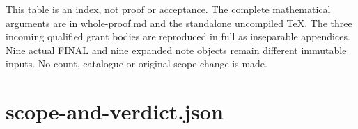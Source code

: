 \documentclass[11pt]{article}
\begin{document}
\begin{ImportedQualifiedGrant}
This table is an index, not proof or acceptance. The complete mathematical arguments are in whole-proof.md and the standalone uncompiled TeX. The three incoming qualified grant bodies are reproduced in full as inseparable appendices. Nine actual FINAL and nine expanded note objects remain different immutable inputs. No count, catalogue or original-scope change is made.


\end{ImportedQualifiedGrant}

\section{scope-and-verdict.json}

\begin{ImportedQualifiedGrant}


\end{ImportedQualifiedGrant}
\end{document}
